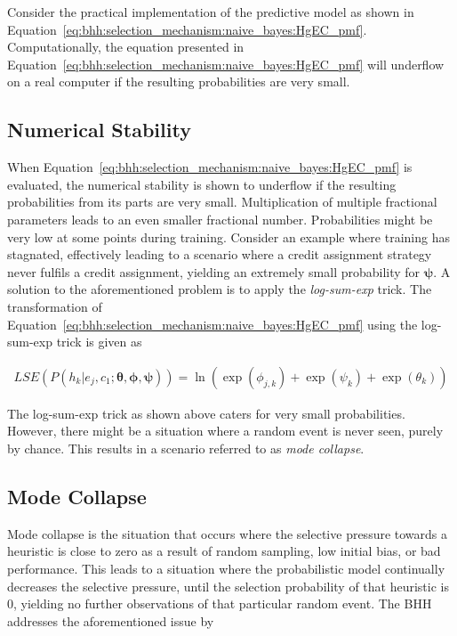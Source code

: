 Consider the practical implementation of the predictive model as shown in Equation~\eqref{eq:bhh:selection_mechanism:naive_bayes:HgEC_pmf}. Computationally, the equation presented in Equation~\eqref{eq:bhh:selection_mechanism:naive_bayes:HgEC_pmf} will underflow on a real computer if the resulting probabilities are very small.

\subsection{Numerical Stability}\label{sec:bhh:selection_mechanism:numerical_stability}

When Equation~\eqref{eq:bhh:selection_mechanism:naive_bayes:HgEC_pmf} is evaluated, the numerical stability is shown to underflow if the resulting probabilities from its parts are very small. Multiplication of multiple fractional parameters leads to an even smaller fractional number. Probabilities might be very low at some points during training. Consider an example where training has stagnated, effectively leading to a scenario where a credit assignment strategy never fulfils a credit assignment, yielding an extremely small probability for $\boldsymbol{\psi}$. A solution to the aforementioned problem is to apply the \textit{log-sum-exp} trick. The transformation of Equation~\eqref{eq:bhh:selection_mechanism:naive_bayes:HgEC_pmf} using the log-sum-exp trick is given as

\begin{equation}
      \label{eq:bhh:selection_mechanism:numerical_stability:log_sum_exp}
      \begin{split}
            LSE(P(h_{k} \vert e_{j}, c_{1};  \boldsymbol{\theta}, \boldsymbol{\phi}, \boldsymbol{\psi})) = \ln(\exp(\phi_{j,k}) +  \exp(\psi_{k}) + \exp(\theta_{k}))
      \end{split}
\end{equation}

The log-sum-exp trick as shown above caters for very small probabilities. However, there might be a situation where a random event is never seen, purely by chance. This results in a scenario referred to as \textit{mode collapse}.

\subsection{Mode Collapse}\label{sec:bhh:selection_mechanism:mode_collapse}

Mode collapse is the situation that occurs where the selective pressure towards a heuristic is close to zero as a result of random sampling, low initial bias, or bad performance. This leads to a situation where the probabilistic model continually decreases the selective pressure, until the selection probability of that heuristic is 0, yielding no further observations of that particular random event. The \acs{BHH} addresses the aforementioned issue by


